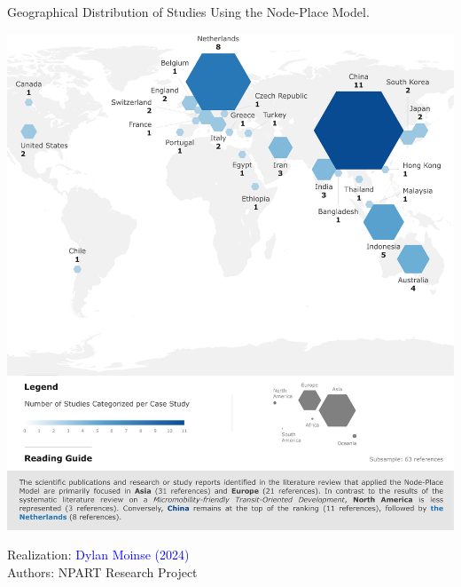 \begin{refsegment}
    \begin{carte}[h!]\vspace*{4pt}
        \caption{Geographical Distribution of Studies Using the Node-Place Model.}
        \label{fig-chap6:repartition-geographique}
        \centerline{\includegraphics[width=1\columnwidth]{src/Figures/Chap-6/EN_NPART_Repartition_geographique.pdf}}
        \vspace{5pt}
        \begin{flushright}\scriptsize{
        Realization: \textcolor{blue}{Dylan Moinse (2024)}
        \\
        Authors: \acrshort{NPART} Research Project
        }\end{flushright}
    \end{carte}


\end{refsegment}
